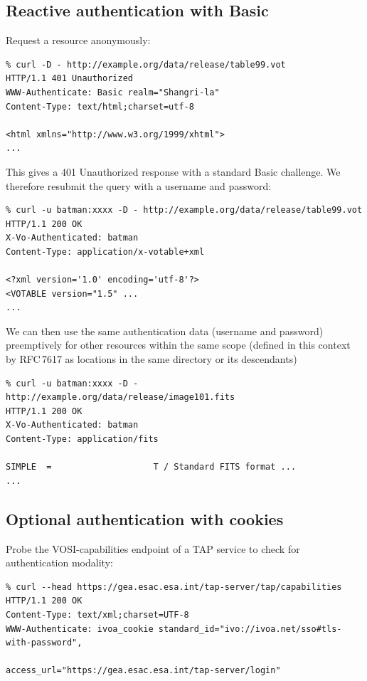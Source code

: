 \documentclass[11pt,a4paper]{ivoa}
\newcommand{\rfc}[1]{RFC\,#1}
\begin{document}
\subsection{Reactive authentication with Basic}

Request a resource anonymously:
{\footnotesize
\begin{verbatim}
% curl -D - http://example.org/data/release/table99.vot
HTTP/1.1 401 Unauthorized
WWW-Authenticate: Basic realm="Shangri-la"
Content-Type: text/html;charset=utf-8

<html xmlns="http://www.w3.org/1999/xhtml">
...
\end{verbatim}
}

\noindent
This gives a 401 Unauthorized response
with a standard Basic challenge.
We therefore resubmit the query with a username and password:
{\footnotesize
\begin{verbatim}
% curl -u batman:xxxx -D - http://example.org/data/release/table99.vot
HTTP/1.1 200 OK
X-Vo-Authenticated: batman
Content-Type: application/x-votable+xml

<?xml version='1.0' encoding='utf-8'?>
<VOTABLE version="1.5" ...
...
\end{verbatim}
}

\noindent
We can then use the same authentication data (username and password)
preemptively for other resources within the same scope
(defined in this context by \rfc{7617} as locations in the same
directory or its descendants)
{\footnotesize
\begin{verbatim}
% curl -u batman:xxxx -D - http://example.org/data/release/image101.fits
HTTP/1.1 200 OK
X-Vo-Authenticated: batman
Content-Type: application/fits

SIMPLE  =                    T / Standard FITS format ...
...
\end{verbatim}
}


\subsection{Optional authentication with cookies}
\label{sec:cookie-example}

Probe the VOSI-capabilities endpoint of a TAP service to check
for authentication modality:
{\footnotesize
\begin{verbatim}
% curl --head https://gea.esac.esa.int/tap-server/tap/capabilities
HTTP/1.1 200 OK
Content-Type: text/xml;charset=UTF-8
WWW-Authenticate: ivoa_cookie standard_id="ivo://ivoa.net/sso#tls-with-password",
                              access_url="https://gea.esac.esa.int/tap-server/login"
\end{verbatim}
}
\end{document}
